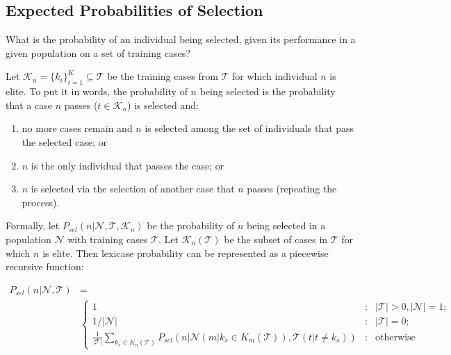 \documentclass[preprint]{article}
\newcommand*\Let[2]{\State #1 $\gets$ #2}
\begin{document}


\begin{table}

\end{table}
\subsection{Expected Probabilities of Selection}
What is the probability of an individual being selected, given its performance in a given population on a set of training cases?  

Let $\mathcal{K}_n = \{k_i\}_{i=1}^K \subseteq \mathcal{T}$ be the training cases from $\mathcal{T}$ for which individual $n$ is elite. To put it in words, the probability of $n$ being selected is the probability that a case $n$ passes ($t \in \mathcal{K}_n$) is selected and: \begin{enumerate} \item no more cases remain and $n$ is selected among the set of individuals that pass the selected case; or \item $n$ is the only individual that passes the case; or \item $n$ is selected via the selection of another case that $n$ passes (repeating the process). \end{enumerate} 

Formally, let $P_{sel}(n | \mathcal{N}, \mathcal{T}, \mathcal{K}_n)$ be the probability of $n$ being selected in a population $\mathcal{N}$ with training cases $\mathcal{T}$. Let $\mathcal{K}_n(\mathcal{T})$ be the subset of cases in $\mathcal{T}$ for which $n$ is elite. Then lexicase probability can be represented as a piecewise recursive function: 


{\scriptsize
\begin{align}\label{eq:prob}
P_{sel}(n | \mathcal{N}, \mathcal{T}) &= \\
 &\left\{\nonumber 
     \begin{array}{lcr}
       1 & : & |\mathcal{T}| >0, |\mathcal{N}| = 1; \\
       1/|\mathcal{N}| & : &|\mathcal{T}| = 0; \\ 
       \frac{1}{|\mathcal{T}|}\sum_{k_s \in K_n(\mathcal{T})}{P_{sel} \left( n | \mathcal{N}(m|k_s \in K_m(\mathcal{T})), \mathcal{T}(t|t \neq k_s) \right)} & : & \text{otherwise}
     \end{array}
   \right. 
\end{align}
}
\end{document}
